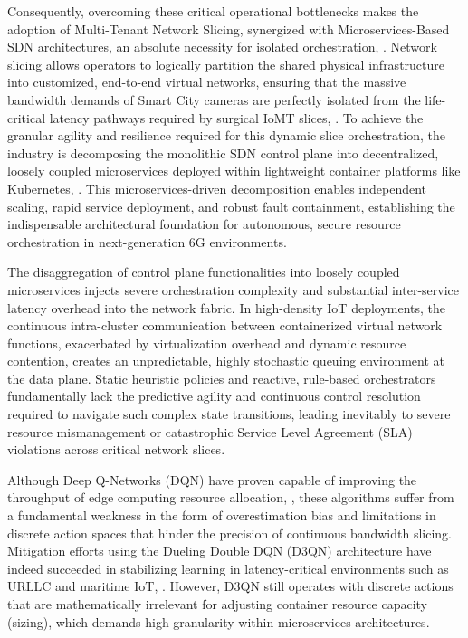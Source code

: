 Consequently, overcoming these critical operational bottlenecks makes the adoption of Multi-Tenant Network Slicing, synergized with Microservices-Based SDN architectures, an absolute necessity for isolated orchestration\cite{b8}, \cite{b9}. Network slicing allows operators to logically partition the shared physical infrastructure into customized, end-to-end virtual networks, ensuring that the massive bandwidth demands of Smart City cameras are perfectly isolated from the life-critical latency pathways required by surgical IoMT slices\cite{b1}, \cite{b2}. To achieve the granular agility and resilience required for this dynamic slice orchestration, the industry is decomposing the monolithic SDN control plane into decentralized, loosely coupled microservices deployed within lightweight container platforms like Kubernetes\cite{b8}, \cite{b10}. This microservices-driven decomposition enables independent scaling, rapid service deployment, and robust fault containment, establishing the indispensable architectural foundation for autonomous, secure resource orchestration in next-generation 6G environments\cite{b8}.

The disaggregation of control plane functionalities into loosely coupled microservices injects severe orchestration complexity and substantial inter-service latency overhead into the network fabric\cite{b11}. In high-density IoT deployments, the continuous intra-cluster communication between containerized virtual network functions, exacerbated by virtualization overhead and dynamic resource contention, creates an unpredictable, highly stochastic queuing environment at the data plane\cite{b12}. Static heuristic policies and reactive, rule-based orchestrators fundamentally lack the predictive agility and continuous control resolution required to navigate such complex state transitions, leading inevitably to severe resource mismanagement or catastrophic Service Level Agreement (SLA) violations across critical network slices\cite{b13}.

Although Deep Q-Networks (DQN) have proven capable of improving the throughput of edge computing resource allocation\cite{b14}, \cite{b15}, these algorithms suffer from a fundamental weakness in the form of overestimation bias and limitations in discrete action spaces that hinder the precision of continuous bandwidth slicing. Mitigation efforts using the Dueling Double DQN (D3QN) architecture have indeed succeeded in stabilizing learning in latency-critical environments such as URLLC and maritime IoT\cite{b13}, \cite{b16}. However, D3QN still operates with discrete actions that are mathematically irrelevant for adjusting container resource capacity (sizing), which demands high granularity within microservices architectures.

